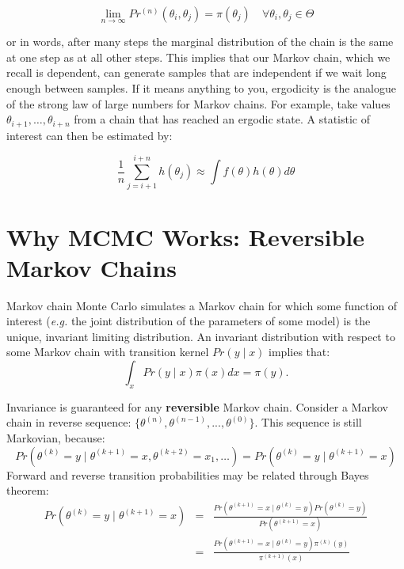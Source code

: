 \begin{itemize}
\[
\lim_{n \to \infty} Pr^{(n)}(\theta_i,\theta_j) = \pi(\theta_j) \quad \forall \theta_i, \theta_j \in \Theta
\]

\noindent or in words, after many steps the marginal distribution of the chain is the same at one step as at all other steps. This implies that our Markov chain, which we recall is dependent, can generate samples that are independent if we wait long enough between samples. If it means anything to you, ergodicity is the analogue of the strong law of large numbers for Markov chains. For example, take values $\theta_{i+1},\ldots,\theta_{i+n}$ from a chain that has reached an ergodic state. A statistic of interest can then be estimated by:

\[
\frac{1}{n}\sum_{j=i+1}^{i+n} h(\theta_j) \approx \int f(\theta) h(\theta) d\theta
\]

\end{itemize}


\hypertarget{reversible-markov-chains}{}
\section*{Why MCMC Works: Reversible Markov Chains}

Markov chain Monte Carlo simulates a Markov chain for which some function of interest (\emph{e.g.} the joint distribution of the parameters of some model) is the unique, invariant limiting distribution. An invariant distribution with respect to some Markov chain with transition kernel $Pr(y \mid x)$ implies that:
\[
\int_x Pr(y \mid x) \pi(x) dx = \pi(y).
\]

Invariance is guaranteed for any \textbf{reversible} Markov chain. Consider a Markov chain in reverse sequence: $\{\theta^{(n)},\theta^{(n-1)},...,\theta^{(0)}\}$. This sequence is still Markovian, because:
\[
Pr(\theta^{(k)}=y \mid \theta^{(k+1)}=x,\theta^{(k+2)}=x_1,\ldots ) = Pr(\theta^{(k)}=y \mid \theta^{(k+1)}=x)
\]
Forward and reverse transition probabilities may be related through Bayes theorem:
\begin{eqnarray}
Pr(\theta^{(k)}=y \mid \theta^{(k+1)}=x) &=& \frac{Pr(\theta^{(k+1)}=x \mid \theta^{(k)}=y) Pr(\theta^{(k)}=y)}{Pr(\theta^{(k+1)}=x)} \nonumber \\
&=& \frac{Pr(\theta^{(k+1)}=x \mid \theta^{(k)}=y) \pi^{(k)}(y)}{\pi^{(k+1)}(x)} \nonumber
\end{eqnarray}

